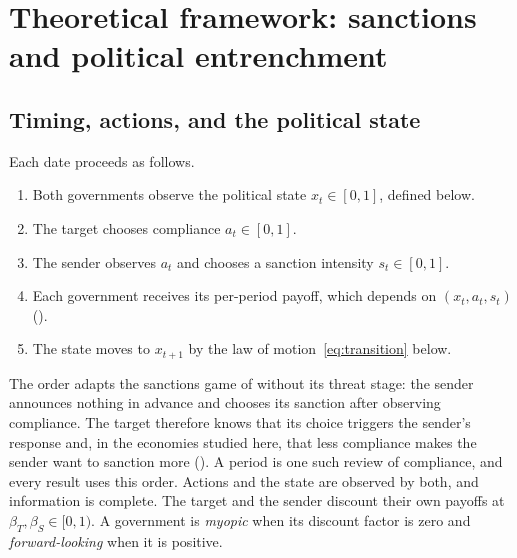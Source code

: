 \section{Theoretical framework: sanctions and political entrenchment}
\label{sec:model}

\subsection{Timing, actions, and the political state}
\label{sec:model:timing}

 Each date proceeds as follows.
\begin{enumerate}[label=(\arabic*)]
\item Both governments observe the political state $x_t\in[0,1]$, defined below.
\item The target chooses compliance $a_t\in[0,1]$.
\item The sender observes $a_t$ and chooses a sanction intensity $s_t\in[0,1]$.
\item Each government receives its per-period payoff, which depends on
$(x_t,a_t,s_t)$ ().
\item The state moves to $x_{t+1}$ by the law of motion~\eqref{eq:transition} below.
\end{enumerate}
The order adapts the sanctions game of \citet{Eaton1992} without its threat stage:
the sender announces nothing in advance and chooses its sanction after observing
compliance. The target therefore knows that its choice triggers the sender's response
and, in the economies studied here, that less compliance makes the sender want to
sanction more (). A period is one such review of
compliance, and every result uses this order. Actions and the state are observed by
both, and information is complete. The target and the sender discount their own
payoffs at $\beta_T,\beta_S\in[0,1)$. A government is \emph{myopic} when its discount
factor is zero and \emph{forward-looking} when it is positive.

